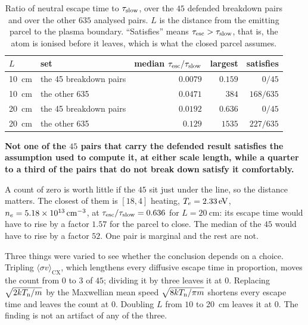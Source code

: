 \begin{table}[htbp]
\centering
\caption{Ratio of neutral escape time to $\tau_{\mathrm{slow}}$, over the $45$ defended
breakdown pairs and over the other $635$ analysed pairs. $L$ is the distance
from the emitting parcel to the plasma boundary. ``Satisfies'' means
$\tau_{\mathrm{esc}} > \tau_{\mathrm{slow}}$, that is, the atom is ionised before it leaves, which is
what the closed parcel assumes.}
\label{tab:transport_selection}
\begin{tabular}{llrrr}
  \toprule
  $L$ & set & median $\tau_{\mathrm{esc}}/\tau_{\mathrm{slow}}$ & largest & satisfies \\
  \midrule
  \SI{10}{\centi\metre} & the 45 breakdown pairs & $0.0079$ & $0.159$ & $0/45$ \\
  \SI{10}{\centi\metre} & the other 635 & $0.0471$ & $384$ & $168/635$ \\
  \SI{20}{\centi\metre} & the 45 breakdown pairs & $0.0192$ & $0.636$ & $0/45$ \\
  \SI{20}{\centi\metre} & the other 635 & $0.129$ & $1535$ & $227/635$ \\
  \bottomrule
\end{tabular}
\end{table}

\textbf{Not one of the $45$ pairs that carry the defended result satisfies the
assumption used to compute it, at either scale length, while a quarter to a
third of the pairs that do not break down satisfy it comfortably.}

A count of zero is worth little if the $45$ sit just under the line, so the
distance matters. The closest of them is $[18,4]$ heating,
$T_e = \SI{2.33}{\electronvolt}$, $n_e = \SI{5.18e13}{\per\cubic\centi\metre}$,
at $\tau_{\mathrm{esc}}/\tau_{\mathrm{slow}} = 0.636$ for $L = \SI{20}{\centi\metre}$: its escape time
would have to rise by a factor $1.57$ for the parcel to close. The median of the
$45$ would have to rise by a factor $52$. One pair is marginal and the rest are
not.

Three things were varied to see whether the conclusion depends on a choice.
Tripling $\langle\sigma v\rangle_{\mathrm{CX}}$, which lengthens every diffusive
escape time in proportion, moves the count from $0$ to $3$ of $45$; dividing it
by three leaves it at $0$. Replacing $\sqrt{2kT_{\mathrm{n}}/m}$ by the Maxwellian mean
speed $\sqrt{8kT_{\mathrm{n}}/\pi m}$ shortens every escape time and leaves the count at
$0$. Doubling $L$ from $10$ to \SI{20}{\centi\metre} leaves it at $0$. The
finding is not an artifact of any of the three.

